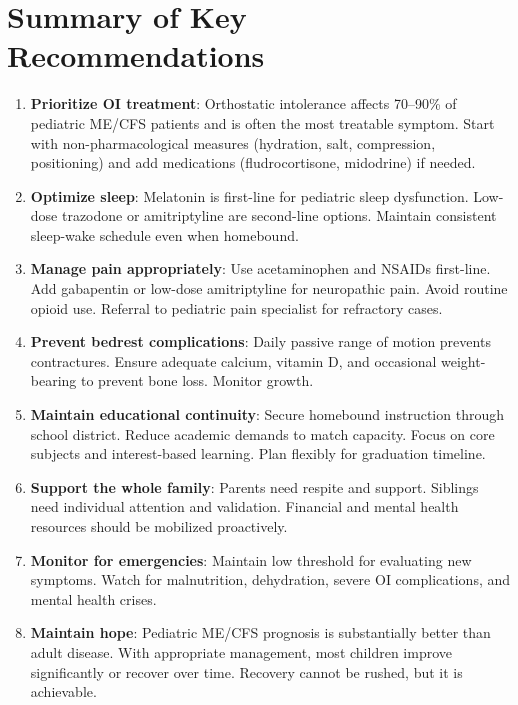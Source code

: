 \section{Summary of Key Recommendations}
\label{sec:ped-severe-summary}

\begin{enumerate}
    \item \textbf{Prioritize OI treatment}: Orthostatic intolerance affects 70--90\% of pediatric ME/CFS patients and is often the most treatable symptom. Start with non-pharmacological measures (hydration, salt, compression, positioning) and add medications (fludrocortisone, midodrine) if needed.

    \item \textbf{Optimize sleep}: Melatonin is first-line for pediatric sleep dysfunction. Low-dose trazodone or amitriptyline are second-line options. Maintain consistent sleep-wake schedule even when homebound.

    \item \textbf{Manage pain appropriately}: Use acetaminophen and NSAIDs first-line. Add gabapentin or low-dose amitriptyline for neuropathic pain. Avoid routine opioid use. Referral to pediatric pain specialist for refractory cases.

    \item \textbf{Prevent bedrest complications}: Daily passive range of motion prevents contractures. Ensure adequate calcium, vitamin D, and occasional weight-bearing to prevent bone loss. Monitor growth.

    \item \textbf{Maintain educational continuity}: Secure homebound instruction through school district. Reduce academic demands to match capacity. Focus on core subjects and interest-based learning. Plan flexibly for graduation timeline.

    \item \textbf{Support the whole family}: Parents need respite and support. Siblings need individual attention and validation. Financial and mental health resources should be mobilized proactively.

    \item \textbf{Monitor for emergencies}: Maintain low threshold for evaluating new symptoms. Watch for malnutrition, dehydration, severe OI complications, and mental health crises.

    \item \textbf{Maintain hope}: Pediatric ME/CFS prognosis is substantially better than adult disease. With appropriate management, most children improve significantly or recover over time. Recovery cannot be rushed, but it is achievable.
\end{enumerate}

